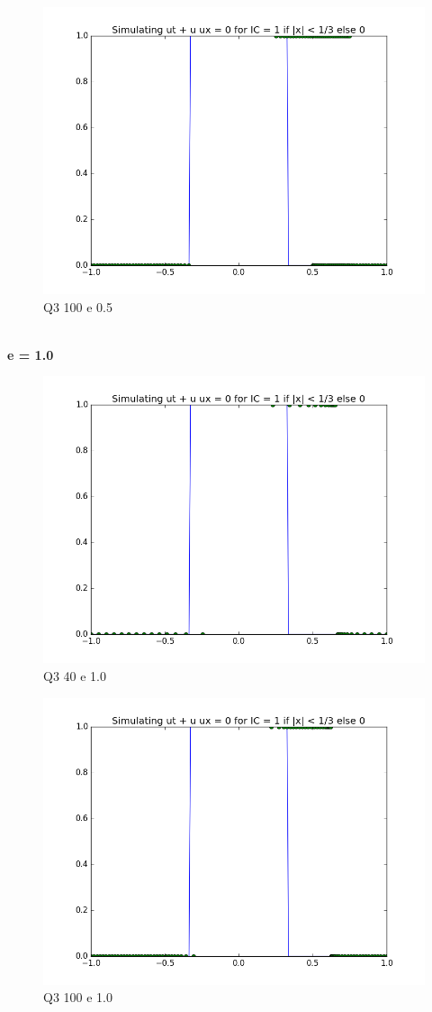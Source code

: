 \documentclass[a4paper,11pt]{article}
\begin{document}
\begin{figure}[ht]
    \centering
    \includegraphics[width=.8\linewidth]{q3_100_05.png}
    \caption{Q3 100 e 0.5}
    \label{fig:ex6}    
\end{figure}
\newpage
\indent\\
\newpage
\indent \textbf{e = 1.0}
\begin{figure}[ht]
    \centering
    \includegraphics[width=.8\linewidth]{q3_40_1.png}
    \caption{Q3 40 e 1.0}
    \label{fig:ex7}    
\end{figure}

\begin{figure}[ht]
    \centering
    \includegraphics[width=.8\linewidth]{q3_100_1.png}
    \caption{Q3 100 e 1.0}
    \label{fig:ex8}    
\end{figure}
\end{document}
